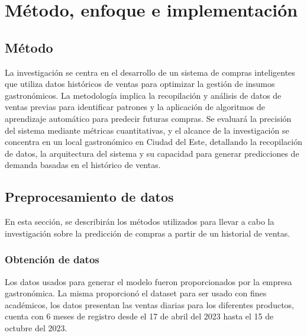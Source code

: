 \fancyhead{}
\fancyfoot{}
\cfoot{\thepage}

\chapter{Método, enfoque e implementación}

\section{Método}

La investigación se centra en el desarrollo de un sistema de compras
inteligentes que utiliza datos históricos de ventas para optimizar la gestión
de insumos gastronómicos. La metodología implica la recopilación y análisis de
datos de ventas previas para identificar patrones y la aplicación de algoritmos
de aprendizaje automático para predecir futuras compras. Se evaluará la
precisión del sistema mediante métricas cuantitativas, y el alcance de la
investigación se concentra en un local gastronómico en Ciudad del Este,
detallando la recopilación de datos, la arquitectura del sistema y su capacidad
para generar predicciones de demanda basadas en el histórico de ventas.


\section{Preprocesamiento de datos}
En esta sección, se describirán los métodos utilizados para llevar a cabo la
investigación sobre la predicción de compras a partir de un historial de ventas.

\subsection{Obtención de datos}
Los datos usados para generar el modelo fueron proporcionados por la empresa
gastronómica. La misma proporcionó el dataset para ser usado con fines
académicos, los datos presentan las ventas diarias para los diferentes
productos, cuenta con 6 meses de registro desde el 17 de abril del 2023 hasta el
15 de octubre del 2023.

